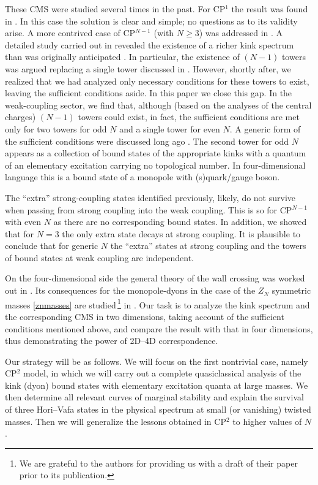 \documentclass[epsfig,12pt]{article}
\begin{document}
	These CMS were studied several times in the past. For CP$^1$ the result was found in \cite{SVZw}.
	In this case the solution is clear and simple; no questions as to its validity arise.
	A more contrived case of 
	CP$^{N-1}$ (with $N\geq 3$) was addressed in \cite{5,Bolokhov:2011mp}. 
	A detailed study carried out in \cite{Bolokhov:2011mp} revealed
	the existence of a richer kink spectrum than was originally anticipated \cite{Dorey:1998yh}. 
	In particular, the existence of $(N-1)$ towers was argued replacing  a single tower discussed in \cite{Dorey:1998yh}. 
	However, shortly after, we realized
	that we had analyzed only necessary conditions for these towers to exist, leaving the sufficient conditions aside.
	In this paper we close this gap. 
	In the weak-coupling sector, we find that, although (based on the analyses of the central charges) $(N-1)$ towers could exist, 
	in fact, the sufficient conditions are met only for two towers for odd $N$ and a single tower for even $N$. 
	A generic form of the sufficient conditions were discussed long ago \cite{Dorey:1999zk}.
	The second tower for odd $N$ appears as a collection of bound states of the appropriate kinks with a quantum of
	an elementary excitation carrying no topological number.  In four-dimensional language this is a bound state of a monopole with (s)quark/gauge boson.

	The ``extra'' strong-coupling states identified previously, likely, do not survive when passing from strong coupling
	into the weak coupling.
	This is so for CP$^{N-1}$ with even $ N $ as there are no corresponding bound states.
	In addition, we showed that for $ N = 3 $ the only extra state decays at strong coupling.
	It is plausible to conclude that for generic $ N $ the ``extra'' states at strong coupling
	and the towers of bound states at weak coupling are independent.

	On the four-dimensional side the general theory of the wall crossing was worked out in \cite{koso}. 
	Its consequences for the monopole-dyons in the case of the $Z_N$ symmetric masses \eqref{znmasses}
	are studied\,\footnote{We are grateful to the authors for providing us with a draft of their paper prior to its publication.}
	in \cite{ndkp}. 
	Our task is to analyze the kink spectrum and the corresponding CMS in two dimensions, 
	taking account of the sufficient conditions mentioned above, 
	and compare the result with that in four dimensions, 
	thus  demonstrating the power of 2D--4D correspondence.
	
	Our strategy will be as follows. We will focus on the first nontrivial case, namely CP$^2$ model,
	in which we will carry out a complete quasiclassical analysis of the kink (dyon) bound states   with elementary
	excitation quanta at large masses. We then determine all relevant curves of marginal stability and explain the survival of three Hori--Vafa \cite{MR1} states in the physical spectrum at small (or vanishing) twisted masses.
	Then we will generalize the lessons obtained in CP$^2$ to higher values of $N$.
\end{document}
